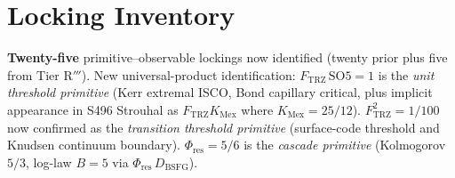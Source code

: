 \documentclass[11pt]{article}
\newcommand{\Ftrz}{F_{\mathrm{TRZ}}}
\newcommand{\Phires}{\Phi_{\mathrm{res}}}
\newcommand{\KMex}{K_{\mathrm{Mex}}}
\newcommand{\Dbsfg}{D_{\mathrm{BSFG}}}
\newcommand{\SOfive}{\mathrm{SO5}}
\begin{document}
\section{Locking Inventory}
\textbf{Twenty-five} primitive--observable lockings now identified
(twenty prior plus five from Tier R$'''$). New universal-product identification:
$\Ftrz\,\SOfive = 1$ is the \emph{unit threshold primitive} (Kerr extremal ISCO,
Bond capillary critical, plus implicit appearance in S496 Strouhal as
$\Ftrz\KMex$ where $\KMex = 25/12$). $\Ftrz^2 = 1/100$ now confirmed as the
\emph{transition threshold primitive} (surface-code threshold and Knudsen
continuum boundary). $\Phires = 5/6$ is the \emph{cascade primitive}
(Kolmogorov $5/3$, log-law $B=5$ via $\Phires\,\Dbsfg$).
\end{document}
